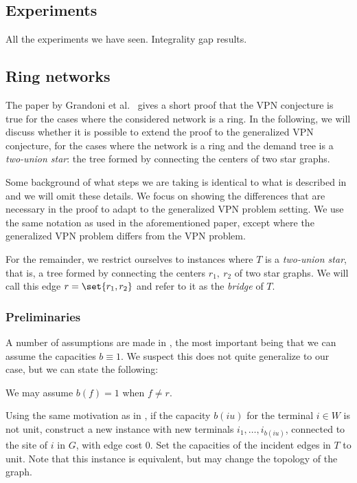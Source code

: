 \subsection{Experiments}
All the experiments we have seen.
Integrality gap results.

\subsection{Ring networks}
The paper by Grandoni et al.~\cite{grandoni2008short} gives a short proof that the VPN conjecture is true for the cases where the considered network is a ring.
In the following, we will discuss whether it is possible to extend the proof to the generalized VPN conjecture, for the cases where the network is a ring and the demand tree is a \emph{two-union star}: the tree formed by connecting the centers of two star graphs.

Some background of what steps we are taking is identical to what is described in \cite{grandoni2008short} and we will omit these details.
We focus on showing the differences that are necessary in the proof to adapt to the generalized VPN problem setting.
We use the same notation as used in the aforementioned paper, except where the generalized VPN problem differs from the VPN problem.

For the remainder, we restrict ourselves to instances where $T$ is a \emph{two-union star}, that is, a tree formed by connecting the centers $r_1,\ r_2$ of two star graphs.
We will call this edge $r = \set{r_1, r_2}$ and refer to it as the \emph{bridge} of $T$.

\subsubsection{Preliminaries}
A number of assumptions are made in \cite{grandoni2008short}, the most important being that we can assume the capacities $b \equiv 1$.
We suspect this does not quite generalize to our case, but we can state the following:

\begin{fact}
    We may assume $b(f) = 1$ when $f \neq r$.
\end{fact}
Using the same motivation as in \cite{grandoni2008short}, if the capacity $b(iu)$ for the terminal $i \in W$ is not unit, construct a new instance with new terminals $i_1, \dots, i_{b(iu)}$, connected to the site of $i$ in $G$, with edge cost $0$.
Set the capacities of the incident edges in $T$ to unit.
Note that this instance is equivalent, but may change the topology of the graph.


